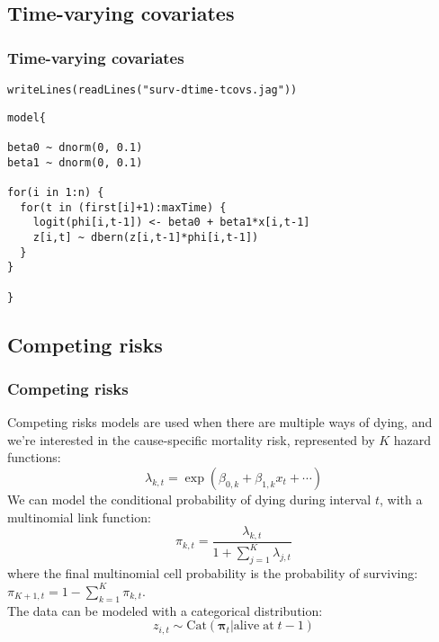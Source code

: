\documentclass[color=usenames,dvipsnames]{beamer}\usepackage[]{graphicx}\usepackage[]{xcolor}
\makeatletter
\newcommand{\hlsng}[1]{\textcolor[rgb]{0.749,0.012,0.012}{#1}}%
\newcommand{\hldef}[1]{\textcolor[rgb]{0,0,0}{#1}}%
\newcommand{\hlkwd}[1]{\textcolor[rgb]{0.004,0.004,0.506}{#1}}%
\newenvironment{kframe}{%
 \def\at@end@of@kframe{}%
 \ifinner\ifhmode%
  \def\at@end@of@kframe{\end{minipage}}%
  \begin{minipage}{\columnwidth}%
 \fi\fi%
 \def\FrameCommand##1{\hskip\@totalleftmargin \hskip-\fboxsep
 \colorbox{shadecolor}{##1}\hskip-\fboxsep
     \hskip-\linewidth \hskip-\@totalleftmargin \hskip\columnwidth}%
 \MakeFramed {\advance\hsize-\width
   \@totalleftmargin\z@ \linewidth\hsize
   \@setminipage}}%
 {\par\unskip\endMakeFramed%
 \at@end@of@kframe}
\newenvironment{knitrout}{}{} %
\makeatother
\begin{document}
\subsection{Time-varying covariates}



\begin{frame}[fragile]
  \frametitle{Time-varying covariates}
\begin{knitrout}
\color{fgcolor}\begin{kframe}
\begin{alltt}
\hlkwd{writeLines}\hldef{(}\hlkwd{readLines}\hldef{(}\hlsng{"surv-dtime-tcovs.jag"}\hldef{))}
\end{alltt}
\end{kframe}
\end{knitrout}
\begin{knitrout}
\color{fgcolor}\begin{kframe}
\begin{verbatim}
model{

beta0 ~ dnorm(0, 0.1)
beta1 ~ dnorm(0, 0.1)

for(i in 1:n) {
  for(t in (first[i]+1):maxTime) {
    logit(phi[i,t-1]) <- beta0 + beta1*x[i,t-1]
    z[i,t] ~ dbern(z[i,t-1]*phi[i,t-1])
  }
}

}
\end{verbatim}
\end{kframe}
\end{knitrout}
\end{frame}




\subsection{Competing risks}


\begin{frame}
  \frametitle{Competing risks}
  \small
  Competing risks models are used when there are multiple ways of
  dying, and we're interested in the cause-specific mortality risk,
  represented by $K$ hazard functions: 
  \[
    \lambda_{k,t} = \exp(\beta_{0,k} + \beta_{1,k}x_{t} + \cdots)
  \]
  \pause
  We can model the conditional probability of dying during interval
  $t$, with a multinomial link function:
  \[
    \pi_{k,t} = \frac{\lambda_{k,t}}{1+\sum_{j=1}^K \lambda_{j,t}}
  \]
  where the final multinomial cell probability is the probability of
  surviving: $\pi_{K+1,t} = 1-\sum_{k=1}^K \pi_{k,t}$. \\
  \pause
  \vfill
  The data can be modeled with a categorical distribution:
  \[
    z_{i,t} \sim \mathrm{Cat}({\bm \pi}_t | \mathrm{alive\; at\;} t-1)
  \]
\end{frame}
\end{document}
